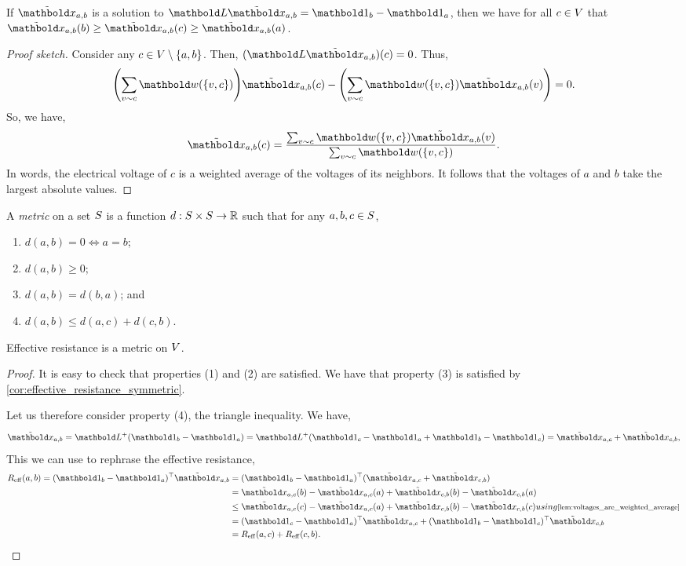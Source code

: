 \begin{lem}\label{lem:voltages_are_weighted_average}
If $\ex_{a,b}$ is a solution to $\mL\ex_{a,b} = \vOne_b - \vOne_a$, then we have for all $c \in V$ that $\ex_{a,b}(b) \geq \ex_{a,b}(c) \geq \ex_{a,b}(a)$.
\end{lem}
\begin{proof}[Proof sketch] Consider any $c \in V \setminus \{a,b\}$. Then, $(\mL\ex_{a,b})(c) = 0$. Thus, \begin{align*}
    \parentheses*{\sum_{v \sim c} \vw(\{v,c\})} \ex_{a,b}(c) - \parentheses*{\sum_{v \sim c} \vw(\{v,c\}) \ex_{a,b}(v)} = 0.
\end{align*} So, we have, \begin{align*}
    \ex_{a,b}(c) = \frac{\sum_{v \sim c} \vw(\{v,c\}) \ex_{a,b}(v)}{\sum_{v \sim c} \vw(\{v,c\})}.
\end{align*} In words, the electrical voltage of $c$ is a weighted average of the voltages of its neighbors. It follows that the voltages of $a$ and $b$ take the largest absolute values.
\end{proof}

\begin{defn}[Metric] A \emph{metric} on a set $S$ is a function $d : S \times S \to \mathbb{R}$ such that for any $a, b, c \in S$, \begin{enumerate}
    \item $d(a,b) = 0 \iff a = b$;
    \item $d(a,b) \geq 0$;
    \item $d(a,b) = d(b,a)$; and
    \item $d(a,b) \leq d(a,c) + d(c,b)$.
\end{enumerate}
\end{defn}
\begin{lem}
Effective resistance is a metric on $V$.
\end{lem}
\begin{proof} It is easy to check that properties (1) and (2) are satisfied. We have that property (3) is satisfied by \cref{cor:effective_resistance_symmetric}.

Let us therefore consider property (4), the triangle inequality. We have, \begin{align*}
    \ex_{a,b} = \pinv{\mL}(\vOne_b - \vOne_a) = \pinv{\mL}(\vOne_c - \vOne_a + \vOne_b - \vOne_c) = \ex_{a,c} + \ex_{c,b},
\end{align*} This we can use to rephrase the effective resistance, \begin{align*}
    \Reff(a,b) = \trans{(\vOne_b - \vOne_a)}\ex_{a,b} &= \trans{(\vOne_b - \vOne_a)}(\ex_{a,c} + \ex_{c,b}) \\
    &= \ex_{a,c}(b) - \ex_{a,c}(a) + \ex_{c,b}(b) - \ex_{c,b}(a) \\
    &\leq \ex_{a,c}(c) - \ex_{a,c}(a) + \ex_{c,b}(b) - \ex_{c,b}(c) \margintag{using \cref{lem:voltages_are_weighted_average}} \\
    &= \trans{(\vOne_c - \vOne_a)}\ex_{a,c} + \trans{(\vOne_b - \vOne_c)}\ex_{c,b} \\
    &= \Reff(a,c) + \Reff(c,b). \qedhere
\end{align*}
\end{proof}